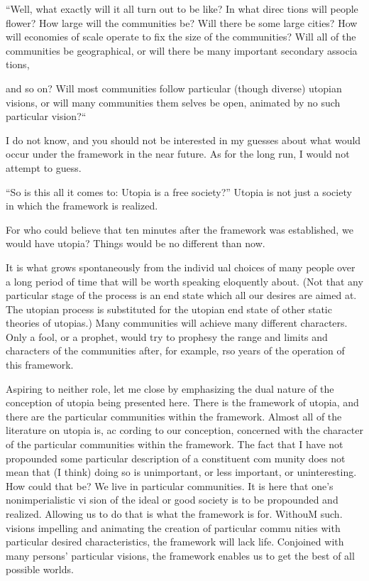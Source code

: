 \documentclass[11pt,openany]{book}
\begin{document}
``Well, what exactly will it all turn out to be like? In what direc tions will people flower? How large will the communities be? Will there be some large cities? How will economies of scale operate to fix the size of the communities? Will all of the communities be geographical, or will there be many important secondary associa tions, 

and so on? Will most communities follow particular (though diverse) utopian visions, or will many communities them selves be open, animated by no such particular vision?`` 

I do not know, and you should not be interested in my guesses about what would occur under the framework in the near future. As for the long run, I would not attempt to guess. 

``So is this all it comes to: Utopia is a free society?'' Utopia is not just a society in which the framework is realized. 

For who could believe that ten minutes after the framework was established, we would have utopia? Things would be no different than now. 

It is what grows spontaneously from the individ ual choices of many people over a long period of time that will be worth speaking eloquently about. (Not that any particular stage of the process is an end state which all our desires are aimed at. The utopian process is substituted for the utopian end state of other static theories of utopias.) Many communities will achieve many different characters. Only a fool, or a prophet, would try to prophesy the range and limits and characters of the communities after, for example, rso years of the operation of this framework. 

Aspiring to neither role, let me close by emphasizing the dual nature of the conception of utopia being presented here. There is the framework of utopia, and there are the particular communities within the framework. Almost all of the literature on utopia is, ac cording to our conception, concerned with the character of the particular communities within the framework. The fact that I have not propounded some particular description of a constituent com munity does not mean that (I think) doing so is unimportant, or less important, or uninteresting. How could that be? We live in particular communities. It is here that one's nonimperialistic vi sion of the ideal or good society is to be propounded and realized. Allowing us to do that is what the framework is for. WithouM such. visions impelling and animating the creation of particular commu nities with particular desired characteristics, the framework will lack life. Conjoined with many persons' particular visions, the framework enables us to get the best of all possible worlds. 
\end{document}
